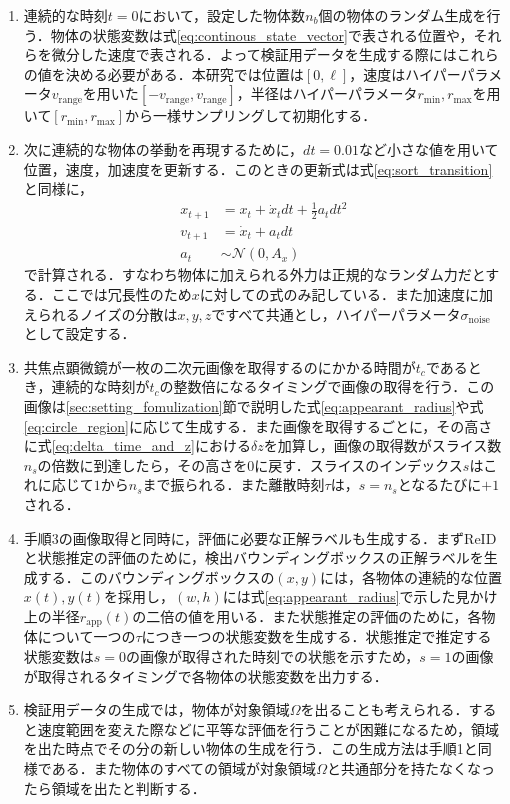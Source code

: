 \begin{enumerate}[label=手順\arabic*]
    \item 連続的な時刻$t=0$において，設定した物体数$n_b$個の物体のランダム生成を行う．物体の状態変数は式\ref{eq:continous_state_vector}で表される位置や，それらを微分した速度で表される．よって検証用データを生成する際にはこれらの値を決める必要がある．本研究では位置は$[0, \ell]$，速度はハイパーパラメータ$v_{\text{range}}$を用いた$[-v_{\text{range}}, v_{\text{range}}]$，半径はハイパーパラメータ$r_{\text{min}}, r_{\text{max}}$を用いて$[r_{\text{min}}, r_{\text{max}}]$から一様サンプリングして初期化する．
    \item 次に連続的な物体の挙動を再現するために，$dt=0.01$など小さな値を用いて位置，速度，加速度を更新する．このときの更新式は式\ref{eq:sort_transition}と同様に，
    \begin{equation}
        \label{eq:transition}
        \begin{aligned}
            x_{t+1} &= x_t + \dot{x}_t dt + \frac{1}{2} a_t dt^2
            \\v_{t+1} &= \dot{x}_t + a_t dt
            \\a_t &\sim \mathcal{N}(0, A_x)
        \end{aligned}
    \end{equation}
    で計算される．すなわち物体に加えられる外力は正規的なランダム力だとする．ここでは冗長性のため$x$に対しての式のみ記している．また加速度に加えられるノイズの分散は$x, y, z$ですべて共通とし，ハイパーパラメータ$\sigma_{\text{noise}}$として設定する．
    \item 共焦点顕微鏡が一枚の二次元画像を取得するのにかかる時間が$t_c$であるとき，連続的な時刻が$t_c$の整数倍になるタイミングで画像の取得を行う．この画像は\ref{sec:setting_fomulization}節で説明した式\ref{eq:appearant_radius}や式\ref{eq:circle_region}に応じて生成する．また画像を取得するごとに，その高さに式\ref{eq:delta_time_and_z}における$\delta z$を加算し，画像の取得数がスライス数$n_s$の倍数に到達したら，その高さを$0$に戻す．スライスのインデックス$s$はこれに応じて$1$から$n_s$まで振られる．また離散時刻$\tau$は，$s=n_s$となるたびに$+1$される．
    \item 手順3の画像取得と同時に，評価に必要な正解ラベルも生成する．まずReIDと状態推定の評価のために，検出バウンディングボックスの正解ラベルを生成する．このバウンディングボックスの$(x, y)$には，各物体の連続的な位置$x(t), y(t)$を採用し，$(w, h)$には式\ref{eq:appearant_radius}で示した見かけ上の半径$r_{\text{app}}(t)$の二倍の値を用いる．また状態推定の評価のために，各物体について一つの$\tau$につき一つの状態変数を生成する．状態推定で推定する状態変数は$s = 0$の画像が取得された時刻での状態を示すため，$s = 1$の画像が取得されるタイミングで各物体の状態変数を出力する．
    \item 検証用データの生成では，物体が対象領域$\Omega$を出ることも考えられる．すると速度範囲を変えた際などに平等な評価を行うことが困難になるため，領域を出た時点でその分の新しい物体の生成を行う．この生成方法は手順1と同様である．また物体のすべての領域が対象領域$\Omega$と共通部分を持たなくなったら領域を出たと判断する．
\end{enumerate}

